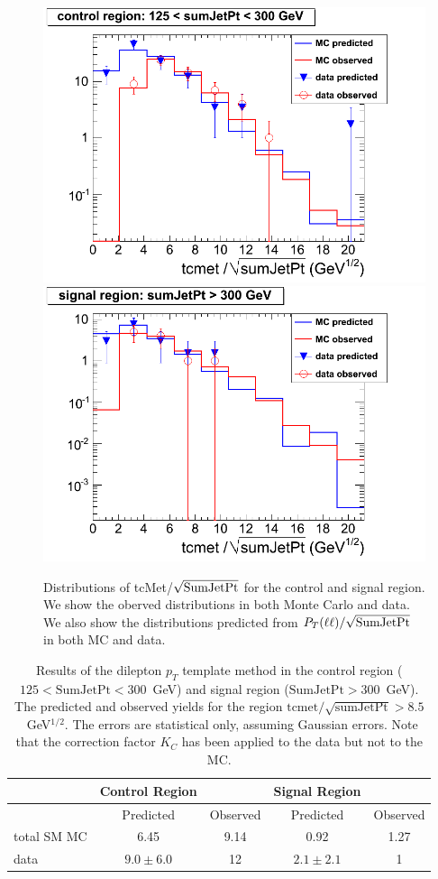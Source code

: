 \begin{figure}[hbt]
\begin{center}
\includegraphics[width=0.48\linewidth]{victory_control_jsonv3.png}
\includegraphics[width=0.48\linewidth]{victory_signal_jsonv3.png}
\caption{\label{fig:victory}\protect Distributions of 
tcMet/$\sqrt{\rm SumJetPt}$ for the control and signal region.
We show the oberved distributions in both Monte Carlo and data.
We also show the distributions predicted from 
${P_T(\ell\ell)}/\sqrt{\rm SumJetPt}$ in both MC and data.}
\end{center}
\end{figure}


\begin{table}[hbt]
\begin{center}
\caption{\label{tab:victory}Results of the dilepton $p_{T}$ template method in the control region
($125 < \mathrm{SumJetPt} < 300$~GeV) and signal region ($\mathrm{SumJetPt} > 300$~GeV). The predicted and 
observed yields for the region $\mathrm{tcmet}/\sqrt{\mathrm{sumJetPt}} > 8.5$~GeV$^{1/2}$. The errors are
statistical only, assuming Gaussian errors. Note that the correction factor $K_C$ has been applied to
the data but not to the MC.  }
\begin{tabular}{l|cc|cc}
\hline
              &    Control Region   &                        &   Signal Region    &               \\
\hline
              & Predicted           &   Observed             &   Predicted        &  Observed     \\              
\hline
total SM   MC &      6.45           &       9.14             &   0.92             &  1.27         \\
         data &  $9.0 \pm 6.0$      &         12             &   $2.1 \pm 2.1$    &  1            \\
\hline
\end{tabular}
\end{center}
\end{table}



